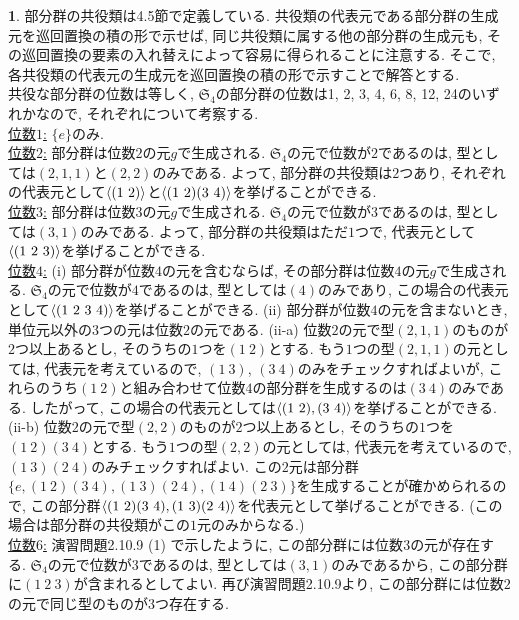 \documentclass{article}
\theoremstyle{definition}
\newtheorem{ans}{}
\numberwithin{ans}{subsection}
\DeclarePairedDelimiter{\gen}{\langle}{\rangle}
\begin{document}
\begin{ans}
  部分群の共役類は4.5節で定義している.
  共役類の代表元である部分群の生成元を巡回置換の積の形で示せば, 同じ共役類に属する他の部分群の生成元も, その巡回置換の要素の入れ替えによって容易に得られることに注意する.
  そこで, 各共役類の代表元の生成元を巡回置換の積の形で示すことで解答とする.\\
  共役な部分群の位数は等しく, $\mathfrak{S}_4$の部分群の位数は1, 2, 3, 4, 6, 8, 12, 24のいずれかなので, それぞれについて考察する.\\
  \underline{位数$1$:}
  $\{e\}$のみ. \\
  \underline{位数$2$:}
  部分群は位数$2$の元$g$で生成される.
  $\mathfrak{S}_4$の元で位数が$2$であるのは, 型としては$(2, 1, 1)$と$(2, 2)$のみである.
  よって, 部分群の共役類は$2$つあり, それぞれの代表元として$\gen{(1\ 2)}$と$\gen{(1\ 2)(3\ 4)}$を挙げることができる.\\
  \underline{位数$3$:} 部分群は位数$3$の元$g$で生成される.
  $\mathfrak{S}_4$の元で位数が$3$であるのは, 型としては$(3, 1)$のみである.
  よって, 部分群の共役類はただ$1$つで, 代表元として$\gen{(1\ 2\ 3)}$を挙げることができる.\\
  \underline{位数$4$:}
  (i) 部分群が位数$4$の元を含むならば, その部分群は位数$4$の元$g$で生成される.
  $\mathfrak{S}_4$の元で位数が$4$であるのは, 型としては$(4)$のみであり,
  この場合の代表元として$\gen{(1\ 2\ 3\ 4)}$を挙げることができる.
  (ii) 部分群が位数$4$の元を含まないとき, 単位元以外の$3$つの元は位数$2$の元である.
  (ii-a) 位数$2$の元で型$(2, 1, 1)$のものが$2$つ以上あるとし, そのうちの$1$つを$(1\ 2)$とする.
  もう$1$つの型$(2, 1, 1)$の元としては, 代表元を考えているので, $(1\ 3)$, $(3\ 4)$のみをチェックすればよいが,
  これらのうち$(1\ 2)$と組み合わせて位数$4$の部分群を生成するのは$(3\ 4)$のみである.
  したがって, この場合の代表元としては$\gen{(1\ 2), (3\ 4)}$を挙げることができる.
  (ii-b) 位数$2$の元で型$(2, 2)$のものが$2$つ以上あるとし, そのうちの$1$つを$(1\ 2)(3\ 4)$とする.
  もう$1$つの型$(2, 2)$の元としては, 代表元を考えているので, $(1\ 3)(2\ 4)$のみチェックすればよい.
  この$2$元は部分群$\{e, (1\ 2)(3\ 4), (1\ 3)(2\ 4), (1\ 4)(2\ 3)\}$を生成することが確かめられるので,
  この部分群$\gen{(1\ 2)(3\ 4), (1\ 3)(2\ 4)}$を代表元として挙げることができる.
  (この場合は部分群の共役類がこの$1$元のみからなる.)\\
  \underline{位数$6$:}
  演習問題2.10.9 (1) で示したように, この部分群には位数$3$の元が存在する.
  $\mathfrak{S}_4$の元で位数が$3$であるのは, 型としては$(3, 1)$のみであるから,
  この部分群に$(1\ 2\ 3)$が含まれるとしてよい. 再び演習問題2.10.9より, この部分群には位数$2$の元で同じ型のものが$3$つ存在する.

\end{ans}
\end{document}
